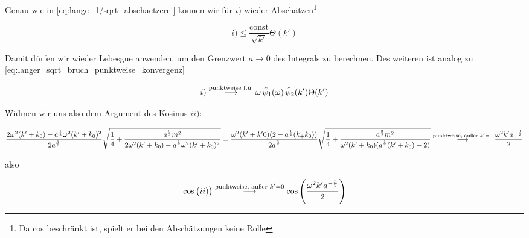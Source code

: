 Genau wie in \cref{eq:lange_1/sqrt_abschaetzerei} können wir für $i)$ wieder Abschätzen\footnote{Da cos beschränkt ist, spielt er bei den Abschätzungen keine Rolle}

\begin{dmath*}
    i)
    \leq
    \frac{\textrm{const}}{\sqrt{k'}} \Theta(k')
\end{dmath*}

Damit dürfen wir wieder Lebesgue anwenden, um den Grenzwert $a \to 0$ des Integrals zu berechnen.
Des weiteren ist analog zu \cref{eq:langer_sqrt_bruch_punktweise_konvergenz}

\begin{dmath}
    i)
    \stackrel{\textrm{\scriptsize punktweise f.ü.}}{\longrightarrow}
    \omega\,\hat\psi_1(\omega) \,\hat\psi_2(k') \Theta(k')
\label{eq:delta_m2_twisted_s=-1_material_a}
\end{dmath}

Widmen wir uns also dem Argument des Kosinus $ii)$:

\begin{dmath*}
    \frac{2\omega^2(k'+k_0)-a^{\frac{1}{2}}\omega^2(k'+k_0)^2}
         {2 a^{\frac{3}{2}}}
    \sqrt{
        \frac{1}{4}
        + \frac{a^{\frac{3}{2}} m^2}
               {2\omega^2(k'+k_0)-a^{\frac{1}{2}}\omega^2(k'+k_0)^2}
    }
    =
    \frac{\omega^2 (k'+k'0)(2-a^{\frac{1}{2}}(k_+k_0))}
         {2 a^{\frac{3}{2}}}
    \sqrt{
        \frac{1}{4}
        + \frac{a^{\frac{3}{2}}m^2}
               {\omega^2(k'+k_0)(a^{\frac{1}{2}}(k'+k_0)-2)}
    }\\
    \stackrel{\textrm{\scriptsize punktweise, außer } k'=0}{\longrightarrow}
    \frac{\omega^2 k' a^{-\frac{3}{2}}}{2}
\end{dmath*}

also

\begin{dmath}
    \cos\big(ii)\big)
    \stackrel{\textrm{\scriptsize punktweise, außer } k'=0}{\longrightarrow}
    \cos\left(\frac{\omega^2 k' a^{-\frac{3}{2}}}{2}\right)
\label{eq:delta_m2_twisted_s=-1_material_b}
\end{dmath}

